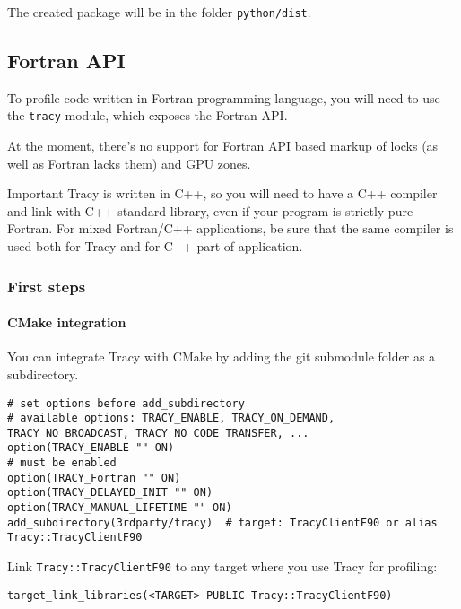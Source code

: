 \documentclass[hidelinks,titlepage,a4paper,twoside]{article}
\begin{document}
The created package will be in the folder \texttt{python/dist}.

\subsection{Fortran API}
\label{fortranapi}

To profile code written in Fortran programming language, you will need to use the \texttt{tracy} module, which exposes the Fortran API.

At the moment, there's no support for Fortran API based markup of locks (as well as Fortran lacks them) and GPU zones.

\begin{bclogo}[
noborder=true,
couleur=black!5,
logo=\bcbombe
]{Important}
Tracy is written in C++, so you will need to have a C++ compiler and link with C++ standard library, even if your program is strictly pure Fortran.
For mixed Fortran/C++ applications, be sure that the same compiler is used both for Tracy and for C++-part of application.
\end{bclogo}

\subsubsection{First steps}

\paragraph{CMake integration}

You can integrate Tracy with CMake by adding the git submodule folder as a subdirectory.

\begin{lstlisting}
# set options before add_subdirectory
# available options: TRACY_ENABLE, TRACY_ON_DEMAND, TRACY_NO_BROADCAST, TRACY_NO_CODE_TRANSFER, ...
option(TRACY_ENABLE "" ON)
# must be enabled
option(TRACY_Fortran "" ON)
option(TRACY_DELAYED_INIT "" ON)
option(TRACY_MANUAL_LIFETIME "" ON)
add_subdirectory(3rdparty/tracy)  # target: TracyClientF90 or alias Tracy::TracyClientF90
\end{lstlisting}

Link \texttt{Tracy::TracyClientF90} to any target where you use Tracy for profiling:

\begin{lstlisting}
target_link_libraries(<TARGET> PUBLIC Tracy::TracyClientF90)
\end{lstlisting}
\end{document}
